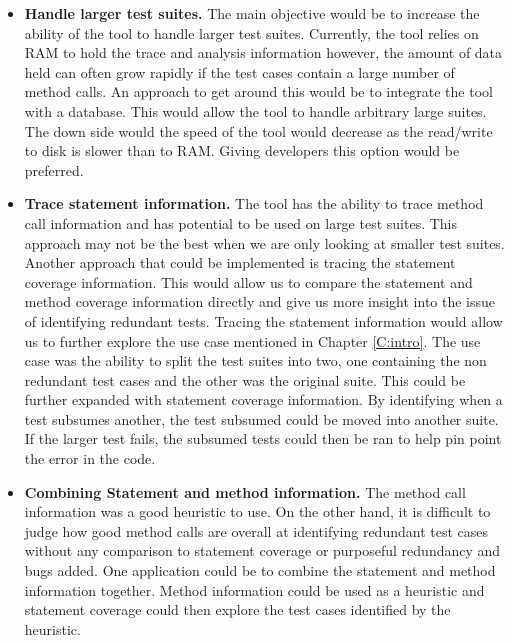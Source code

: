 \documentclass[11pt
              , a4paper
              , twoside
              , openright
              ]{report}
\begin{document}
\begin{itemize}

\item \textbf{Handle larger test suites.} The main objective would be to increase the ability of the tool to handle larger test suites. Currently, the tool relies on RAM to hold the trace and analysis information however, the amount of data held can often grow rapidly if the test cases contain a large number of method calls. An approach to get around this would be to integrate the tool with a database. This would allow the tool to handle arbitrary large suites. The down side would the speed of the tool would decrease as the read/write to disk is slower than to RAM. Giving developers this option would be preferred. 

\item \textbf{Trace statement information.} The tool has the ability to trace method call information and has potential to be used on large test suites. This approach may not be the best when we are only looking at smaller test suites. Another approach that could be implemented is tracing the statement coverage information. This would allow us to compare the statement and method coverage information directly and give us more insight into the issue of identifying redundant tests. Tracing the statement information would allow us to further explore the use case mentioned in Chapter \ref{C:intro}. The use case was the ability to split the test suites into two, one containing the non redundant test cases and the other was the original suite. This could be further expanded with statement coverage information. By identifying when a test subsumes another, the test subsumed could be moved into another suite. If the larger test fails, the subsumed tests could then be ran to help pin point the error in the code.

\item \textbf{Combining Statement and method information.} The method call information was a good heuristic to use. On the other hand, it is difficult to judge how good method calls are overall at identifying redundant test cases without any comparison to statement coverage or purposeful redundancy and bugs added. One application could be to combine the statement and method information together. Method information could be used as a heuristic and statement coverage could then explore the test cases identified by the heuristic.

\end{itemize}
\end{document}

